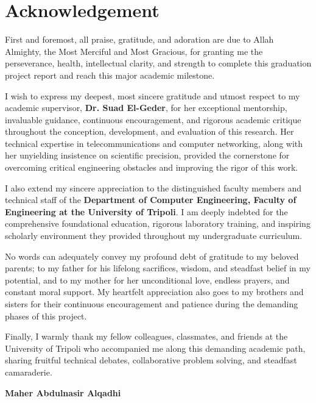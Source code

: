 \documentclass[12pt,a4paper,oneside]{report}
\begin{document}
\clearpage

\chapter*{Acknowledgement}

First and foremost, all praise, gratitude, and adoration are due to Allah Almighty, the Most Merciful and Most Gracious, for granting me the perseverance, health, intellectual clarity, and strength to complete this graduation project report and reach this major academic milestone.

I wish to express my deepest, most sincere gratitude and utmost respect to my academic supervisor, \textbf{Dr. Suad El-Geder}, for her exceptional mentorship, invaluable guidance, continuous encouragement, and rigorous academic critique throughout the conception, development, and evaluation of this research. Her technical expertise in telecommunications and computer networking, along with her unyielding insistence on scientific precision, provided the cornerstone for overcoming critical engineering obstacles and improving the rigor of this work.

I also extend my sincere appreciation to the distinguished faculty members and technical staff of the \textbf{Department of Computer Engineering, Faculty of Engineering at the University of Tripoli}. I am deeply indebted for the comprehensive foundational education, rigorous laboratory training, and inspiring scholarly environment they provided throughout my undergraduate curriculum.

No words can adequately convey my profound debt of gratitude to my beloved parents; to my father for his lifelong sacrifices, wisdom, and steadfast belief in my potential, and to my mother for her unconditional love, endless prayers, and constant moral support. My heartfelt appreciation also goes to my brothers and sisters for their continuous encouragement and patience during the demanding phases of this project.

Finally, I warmly thank my fellow colleagues, classmates, and friends at the University of Tripoli who accompanied me along this demanding academic path, sharing fruitful technical debates, collaborative problem solving, and steadfast camaraderie.

\vspace{1.5cm}
\noindent
\textbf{Maher Abdulnasir Alqadhi}

\clearpage
\end{document}

